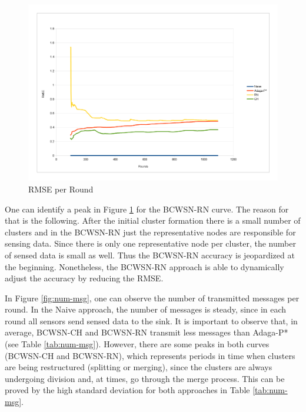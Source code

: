 \documentclass[conference]{IEEEtran}
\begin{document}
\begin{figure}[!htb]
\centering
	\includegraphics[scale=0.11]{RMSEGRAPHIC_.png}
    \caption{RMSE per Round}
    \label{fig:rmse}
\end{figure}

One can identify a peak in Figure \ref{fig:rmse} for the BCWSN-RN curve. The
reason for that is the following. After the initial cluster formation there is a
small number of clusters and in the BCWSN-RN just the representative nodes are
responsible for sensing data. Since there is only one representative node per
cluster, the number of sensed data is small as well. Thus the BCWSN-RN accuracy
is jeopardized at the beginning. Nonetheless, the BCWSN-RN approach is able to
dynamically adjust the accuracy by reducing the RMSE.

In Figure \ref{fig:num-msg}, one can observe the number of transmitted messages
per round.
In the Naive approach, the number of messages is steady, since in each round all
sensors send sensed data to the sink.
It is important to observe that, in average, BCWSN-CH and BCWSN-RN transmit less
messages than Adaga-P* (see Table \ref{tab:num-msg}). However, there are some
peaks in both curves (BCWSN-CH and BCWSN-RN), which represents periods in time
when clusters are being restructured (splitting or merging), since the clusters
are always undergoing division and, at times, go through the merge process. This
can be proved by the high standard deviation for both approaches in Table
\ref{tab:num-msg}.
\end{document}
